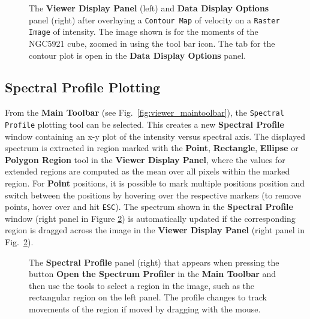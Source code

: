\begin{figure}[h!]
\begin{center}
\caption{\label{fig:viewer_rascon} The {\bf Viewer Display Panel}
(left) and {\bf Data Display Options} panel (right) after overlaying
a {\tt Contour Map} of velocity on a {\tt Raster Image} of intensity.  The
image shown is for the moments of the NGC5921 cube, zoomed in using the tool bar icon.
The tab for the contour plot is open in the {\bf Data Display Options} 
panel.} 
\hrulefill
\end{center}
\end{figure}

\subsection{Spectral Profile Plotting}
\label{section:display.image.specprof}
From the {\bf Main Toolbar} (see Fig.~\ref{fig:viewer_maintoolbar}),
the {\tt Spectral Profile} plotting tool can be selected.  This
creates a new {\bf Spectral Profile} window containing an x-y plot of
the intensity versus spectral axis. The displayed spectrum is
extracted in region marked with the {\bf Point}, {\bf Rectangle}, {\bf
  Ellipse} or {\bf Polygon Region} tool in the {\bf Viewer Display
  Panel}, where the values for extended regions are computed as the
mean over all pixels within the marked region. For {\bf Point}
positions, it is possible to mark multiple positions position and
switch between the positions by hovering over the respective markers
(to remove points, hover over and hit {\tt ESC}).  The spectrum shown
in the {\bf Spectral Profile} window (right panel in Figure
\ref{fig:viewer_specprof}) is automatically updated if the
corresponding region is dragged across the image in the {\bf Viewer
  Display Panel} (right panel in Fig.~\ref{fig:viewer_specprof}).

\begin{figure}[h!]
\begin{center}
\caption{\label{fig:viewer_specprof} The {\bf Spectral Profile} panel (right)
that appears when pressing the button {\bf Open the Spectrum Profiler} in the
{\bf Main Toolbar} and then use the tools to select a region in the image,
such as the rectangular region on the left panel. The profile changes to
track movements of the region if moved by dragging with
the mouse.} 
\hrulefill
\end{center}
\end{figure}
